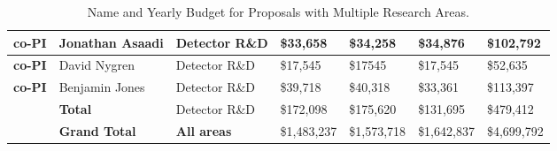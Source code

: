 \begin{table}[htb]
\begin{tabular}{ || l || l |  p{1.7cm} | p{1.7cm} | p{1.7cm} || p{1.7cm} | p{1.8cm} || }
\textbf{co-PI} & Jonathan Asaadi & Detector R\&D & \$33,658 & \$34,258 & \$34,876 & \$102,792 \\ \hline\hline
\textbf{co-PI} & David Nygren & Detector R\&D & \$17,545 & \$17545 & \$17,545 & \$52,635 \\ \hline\hline
\textbf{co-PI} & Benjamin Jones & Detector R\&D & \$39,718 & \$40,318 & \$33,361 & \$113,397 \\ \hline\hline
 & \textbf{Total} & Detector R\&D & \$172,098 & \$175,620 & \$131,695 & \$479,412 \\ \hline\hline\hline
 & \textbf{Grand Total} & \textbf{All areas} & \$1,483,237 & \$1,573,718 & \$1,642,837 & \$4,699,792 \\ \hline\hline\hline
\end{tabular}
\caption{Name and Yearly Budget for Proposals with Multiple Research Areas.}
\end{table}
